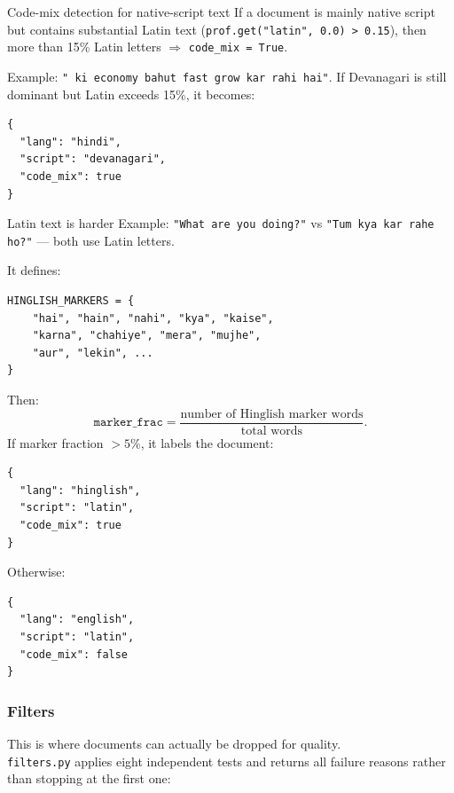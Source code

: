 \begin{paragraphblock}{Code-mix detection for native-script text}
  If a document is mainly native script but contains substantial Latin text
  (\texttt{prof.get("latin", 0.0) > 0.15}), then more than 15\% Latin letters
  $\Rightarrow$ \texttt{code\_mix = True}.

  Example: \texttt{"}\texttt{ ki economy bahut fast grow kar rahi
  hai"}. If Devanagari is still dominant but Latin exceeds 15\%, it becomes:
\begin{lstlisting}[style=shadedpython,breaklines=true]
{
  "lang": "hindi",
  "script": "devanagari",
  "code_mix": true
}
\end{lstlisting}
\end{paragraphblock}

\begin{paragraphblock}{Latin text is harder}
  Example: \texttt{"What are you doing?"} vs \texttt{"Tum kya kar rahe ho?"}
  --- both use Latin letters.

  It defines:
\begin{lstlisting}[style=shadedpython,breaklines=true]
HINGLISH_MARKERS = {
    "hai", "hain", "nahi", "kya", "kaise",
    "karna", "chahiye", "mera", "mujhe",
    "aur", "lekin", ...
}
\end{lstlisting}
  Then:
  \[
    \texttt{marker\_frac}
    =\frac{\text{number of Hinglish marker words}}{\text{total words}}.
  \]
  If marker fraction $> 5\%$, it labels the document:
\begin{lstlisting}[style=shadedpython,breaklines=true]
{
  "lang": "hinglish",
  "script": "latin",
  "code_mix": true
}
\end{lstlisting}
  Otherwise:
\begin{lstlisting}[style=shadedpython,breaklines=true]
{
  "lang": "english",
  "script": "latin",
  "code_mix": false
}
\end{lstlisting}
\end{paragraphblock}

\subsubsection{Filters}

This is where documents can actually be dropped for quality. \\
\texttt{filters.py} applies eight independent tests and returns all failure
reasons rather than stopping at the first one:

